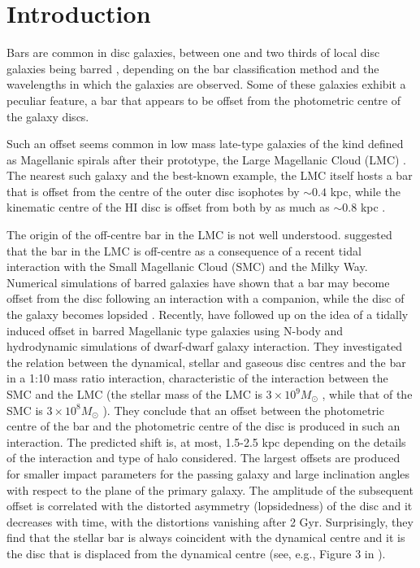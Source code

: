 \documentclass[a4paper,fleqn,usenatbib,useAMS]{mnras}
\begin{document}
\section{Introduction}

Bars are common in disc galaxies, between one and two thirds of local disc galaxies being barred \citep{Sellwood1993,Sheth2008,Masters2011}, depending on the bar classification method and the wavelengths in which the galaxies are observed. Some of these galaxies exhibit a peculiar feature, a bar that appears to be offset from the photometric centre of the galaxy discs. 

Such an offset seems common in low mass late-type galaxies of the kind \citet{Vauc1972} defined as Magellanic spirals after their prototype, the Large Magellanic Cloud (LMC) \citep{deVauc1955}. The nearest such galaxy and the best-known example, the LMC itself hosts a bar that is offset from the centre of the outer disc isophotes by $\sim$$0.4$ kpc, while the kinematic centre of the HI disc is offset from both by as much as $\sim$$ 0.8$ kpc \citep{vanMarel2001}.  

The origin of the off-centre bar in the LMC is not well understood. \citet{Zhao2000} suggested that the bar in the LMC is off-centre as a consequence of a recent tidal interaction with the Small Magellanic Cloud (SMC) and the Milky Way. Numerical simulations of barred galaxies have shown that a bar may become offset from the disc following an interaction with a companion, while the disc of the galaxy becomes lopsided \citep{Athanassoula1996, Athanassoula1997,Berentzen2003,Besla2012,Yozin2014}. Recently, \citet{Pardy2016} have followed up on the idea of a tidally induced offset in barred Magellanic type galaxies using N-body and hydrodynamic simulations of dwarf-dwarf galaxy interaction. They investigated the relation between the dynamical, stellar and gaseous disc centres and the bar in a 1:10 mass ratio interaction, characteristic of the interaction between the SMC and the LMC (the stellar mass of the LMC is $3\times10^9 M_{\odot}$ \citep{vanderMarel2002}, while that of the SMC is $3\times10^8 M_{\odot}$ \citep{SMC2004}). They conclude that an offset between the photometric centre of the bar and the photometric centre of the disc is produced in such an interaction. The predicted shift is, at most, 1.5-2.5 kpc depending on the details of the interaction and type of halo considered. The largest offsets are produced for smaller impact parameters for the passing galaxy and large inclination angles with respect to the plane of the primary galaxy. The amplitude of the subsequent offset is correlated with the distorted asymmetry (lopsidedness) of the disc and it decreases with time, with the distortions vanishing after 2 Gyr. Surprisingly, they find that the stellar bar is always coincident with the dynamical centre and it is the disc that is displaced from the dynamical centre (see, e.g., Figure 3 in \citealt{Pardy2016}).
\end{document}
